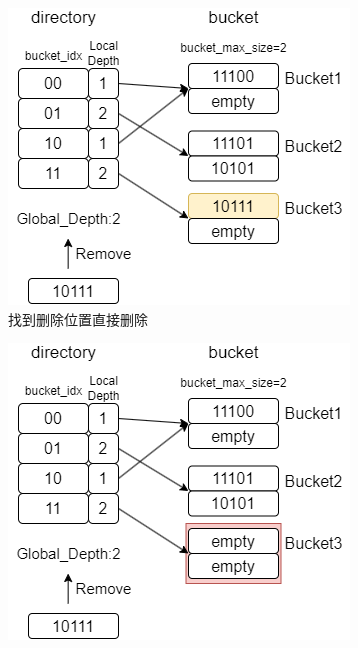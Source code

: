 \documentclass[a4paper]{article}
\begin{document}
\begin{figure}[h!]
   \centering
   \begin{minipage}[b]{0.4\linewidth}
     \centering
     \begin{subfigure}{}
       \includegraphics[width=\linewidth]{13.png}
       \caption{找到删除位置直接删除}
     \end{subfigure}
     \vfill
     \begin{subfigure}{}
       \includegraphics[width=\linewidth]{14.png}

\end{subfigure}
\end{minipage}
\end{figure}
\end{document}
